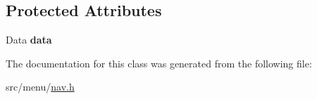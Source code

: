 \subsection*{Protected Attributes}
\begin{DoxyCompactItemize}
\item 
\mbox{\label{classStaticNav_a6870b765b0896ec89064d74e816f32a3}} 
Data {\bfseries data}
\end{DoxyCompactItemize}


The documentation for this class was generated from the following file\+:\begin{DoxyCompactItemize}
\item 
src/menu/\hyperlink{nav_8h}{nav.\+h}\end{DoxyCompactItemize}
